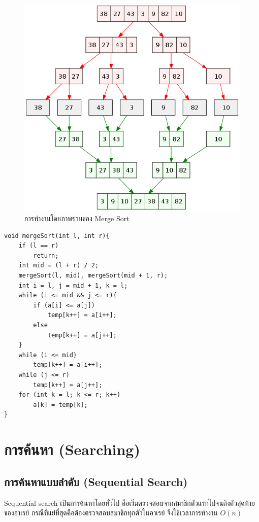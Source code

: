 \begin{figure}[h!]
	\centering
    \includegraphics[width=13cm]{images/merge-sort}
    \caption{การทำงานโดยภาพรวมของ Merge Sort}
    \label{fig:merge-sort}
\end{figure}

\newpage

\begin{lstlisting}
void mergeSort(int l, int r){
	if (l == r)
		return;
	int mid = (l + r) / 2;
	mergeSort(l, mid), mergeSort(mid + 1, r);
	int i = l, j = mid + 1, k = l;
	while (i <= mid && j <= r){
		if (a[i] <= a[j])
			temp[k++] = a[i++];
		else
			temp[k++] = a[j++];
	}
	while (i <= mid)
		temp[k++] = a[i++];
	while (j <= r)
		temp[k++] = a[j++];
	for (int k = l; k <= r; k++)
		a[k] = temp[k];
}
\end{lstlisting}

\section{การค้นหา (Searching)}
\subsection{การค้นหาแบบลำดับ (Sequential Search)}

Sequential search เป้นการค้นหาโดยทั่วไป คือเริ่มตรวจสอบจากสมาชิกตัวแรกไปจนถึงตัวสุดท้ายของอาเรย์ กรณีที่แย่ที่สุดคือต้องตรวจสอบสมาชิกทุกตัวในอาเรย์ จึงใช้เวลาการทำงาน $O(n)$

